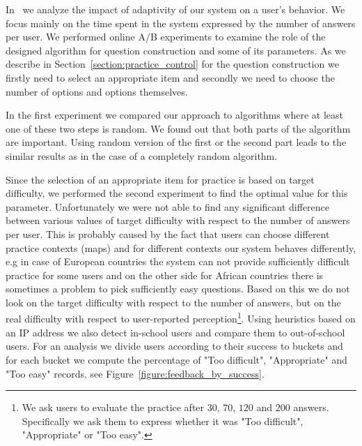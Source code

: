 \documentclass[table,color,cover,twoside,nolot,nolof]{fithesis3/fithesis3}
\begin{document}
In~\cite{papousek2015impact} we analyze the impact of adaptivity of our system
on a user's behavior. We focus mainly on the time spent in the system expressed
by the number of answers per user. We performed online A/B experiments to examine
the role of the designed algorithm for question construction and some of its
parameters. As we describe in Section~\ref{section:practice_control} for the
question construction we firstly need to select an appropriate item and secondly
we need to choose the number of options and options themselves.

In the first experiment we compared our approach to algorithms where at least
one of these two steps is random. We found out that both parts of the algorithm
are important. Using random version of the first or the second part leads to
the similar results as in the case of a completely random algorithm.

Since the selection of an appropriate item for practice is based on target
difficulty, we performed the second experiment to find the optimal value for
this parameter. Unfortunately we were not able to find any significant
difference between various values of target difficulty with respect to the number
of answers per user. This is probably caused by the fact that users can choose
different practice contexts (maps) and for different contexts our system
behaves differently, e.g in case of European countries the system can not
provide sufficiently difficult practice for some users and on the other side
for African countries there is sometimes a problem to pick sufficiently easy
questions. Based on this we do not look on the target difficulty with respect to
the number of answers, but on the real difficulty with respect to user-reported
perception\footnote{We ask users to evaluate the practice after $30$, $70$,
$120$ and $200$ answers. Specifically we ask them to express whether it was "Too
difficult", "Appropriate" or "Too easy".}. Using heuristics based on an IP address
we also detect in-school users and compare them to out-of-school users. For an
analysis we divide users according to their success to buckets and for each
bucket we compute the percentage of "Too difficult", "Appropriate" and "Too
easy" records, see Figure~\ref{figure:feedback_by_success}.
\end{document}
